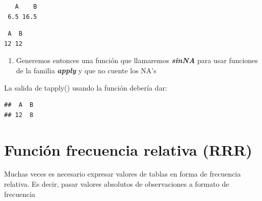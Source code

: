 \documentclass[]{book}
\newenvironment{Shaded}{\begin{snugshade}}{\end{snugshade}}
\newcommand{\CommentTok}[1]{\textcolor[rgb]{0.56,0.35,0.01}{\textit{#1}}}
\newcommand{\DataTypeTok}[1]{\textcolor[rgb]{0.13,0.29,0.53}{#1}}
\newcommand{\KeywordTok}[1]{\textcolor[rgb]{0.13,0.29,0.53}{\textbf{#1}}}
\newcommand{\NormalTok}[1]{#1}
\newcommand{\OperatorTok}[1]{\textcolor[rgb]{0.81,0.36,0.00}{\textbf{#1}}}
\providecommand{\tightlist}{%
  \setlength{\itemsep}{0pt}\setlength{\parskip}{0pt}}
\begin{document}
\begin{Shaded}
\end{Shaded}

\begin{verbatim}
   A    B 
 6.5 16.5 
\end{verbatim}

\begin{Shaded}
\end{Shaded}

\begin{verbatim}
 A  B 
12 12 
\end{verbatim}

\begin{enumerate}
\def\labelenumi{\arabic{enumi}.}
\tightlist
\item
  Generemos entonces una función que llamaremos \textbf{\emph{sinNA}} para usar funciones de la familia \textbf{\emph{apply}} y que no cuente los NA's
\end{enumerate}

La salida de tapply() usando la función debería dar:

\begin{Shaded}
\end{Shaded}

\begin{verbatim}
##  A  B 
## 12  8
\end{verbatim}

\hypertarget{funciuxf3n-frecuencia-relativa-rrr}{%
\section{Función frecuencia relativa (RRR)}\label{funciuxf3n-frecuencia-relativa-rrr}}

Muchas veces es necesario expresar valores de tablas en forma de frecuencia relativa. Es decir, pasar valores absolutos de observaciones a formato de frecuencia
\end{document}
